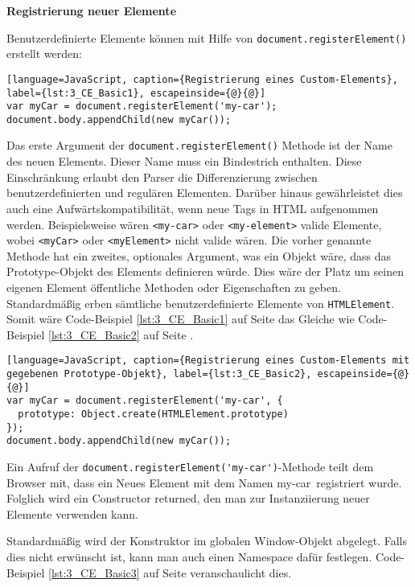 \textbf{Registrierung neuer Elemente}

Benutzerdefinierte Elemente können mit Hilfe von \lstinline|document.registerElement()| erstellt werden:

\begin{lstlisting}[language=JavaScript, caption={Registrierung eines Custom-Elements}, label={lst:3_CE_Basic1}, escapeinside={@}{@}]
var myCar = document.registerElement('my-car');
document.body.appendChild(new myCar());
\end{lstlisting}

Das erste Argument der \lstinline|document.registerElement()| Methode ist der Name des neuen Elements. Dieser Name muss ein Bindestrich enthalten. Diese Einschränkung erlaubt den Parser die Differenzierung zwischen benutzerdefinierten und regulären Elementen. Darüber hinaus gewährleistet dies auch eine Aufwärtskompatibilität, wenn neue Tags in HTML aufgenommen werden. Beispielsweise wären \lstinline|<my-car>| oder \lstinline|<my-element>| valide Elemente, wobei \lstinline|<myCar>| oder \lstinline|<myElement>| nicht valide wären. Die vorher genannte Methode hat ein zweites, optionales Argument, was ein Objekt wäre, dass das Prototype-Objekt des Elements definieren würde. Dies wäre der Platz um seinen eigenen Element öffentliche Methoden oder Eigenschaften zu geben. Standardmäßig erben sämtliche benutzerdefinierte Elemente von \lstinline|HTMLElement|. Somit wäre Code-Beispiel \ref{lst:3_CE_Basic1} auf Seite \pageref{lst:3_CE_Basic1} das Gleiche wie Code-Beispiel \ref{lst:3_CE_Basic2} auf Seite \pageref{lst:3_CE_Basic2}.

\begin{lstlisting}[language=JavaScript, caption={Registrierung eines Custom-Elements mit gegebenen Prototype-Objekt}, label={lst:3_CE_Basic2}, escapeinside={@}{@}]
var myCar = document.registerElement('my-car', {
  prototype: Object.create(HTMLElement.prototype)
});
document.body.appendChild(new myCar());
\end{lstlisting}

Ein Aufruf der \lstinline|document.registerElement('my-car')|-Methode teilt dem Browser mit, dass ein Neues Element mit dem Namen \glqq my-car\grqq\ registriert wurde. Folglich wird ein Constructor returned, den man zur Instanziierung neuer Elemente verwenden kann.

Standardmäßig wird der Konstruktor im globalen Window-Objekt abgelegt. Falls dies nicht erwünscht ist, kann man auch einen Namespace dafür festlegen. Code-Beispiel \ref{lst:3_CE_Basic3} auf Seite \pageref{lst:3_CE_Basic3} veranschaulicht dies.

